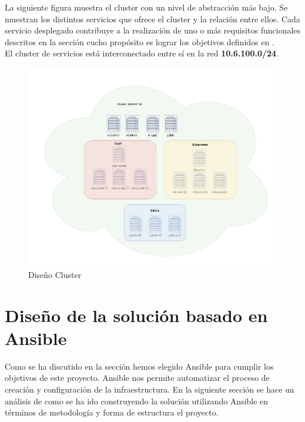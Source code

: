 \begin{text}
	La siguiente figura muestra el cluster con un nivel de abstracción más bajo. Se muestran los distintos servicios que ofrece el cluster y la relación entre ellos. Cada servicio desplegado contribuye a la realización de uno o más requisitos funcionales descritos en la sección  cucho propósito es lograr los objetivos definidos en . \\
	El cluster de servicios está interconectado entre sí en la red \textbf{10.6.100.0/24}.
\end{text}
\begin{figure}[!hbt]
	\centering
	\includegraphics[scale=0.40]{imagenes/Diseno/diagrama_cluster_2.png}
	\caption[Diseño Cluster]{Diseño Cluster} 
	\label{cluster_design}
\end{figure}

\section{Diseño de la solución basado en Ansible}
\begin{text}
	Como se ha discutido en la sección  hemos elegido Ansible para cumplir los objetivos de este proyecto. Ansible nos permite automatizar el proceso de creación y configuración de la infraestructura. En la siguiente sección se hace un análisis de como se ha ido construyendo la solución utilizando Ansible en términos de metodología y forma de estructura el proyecto.
\end{text}

